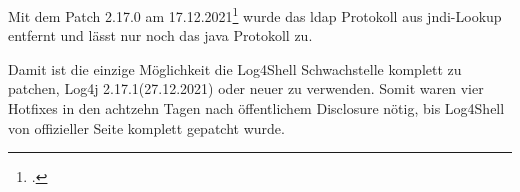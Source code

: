 Mit dem Patch 2.17.0 am 17.12.2021\footcite{log4jChange} wurde das \gls{ldap} Protokoll aus \gls{jndi}-Lookup entfernt und lässt nur noch das java Protokoll zu.

Damit ist die einzige Möglichkeit die Log4Shell Schwachstelle komplett zu patchen, Log4j 2.17.1(27.12.2021) oder neuer zu verwenden.
Somit waren vier Hotfixes in den achtzehn Tagen nach öffentlichem Disclosure nötig, bis Log4Shell von offizieller Seite komplett gepatcht wurde.
